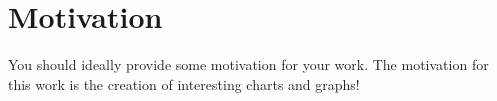 \section*{Motivation}
You should ideally provide some motivation for your work.
The motivation for this work is the creation of interesting charts and graphs!


